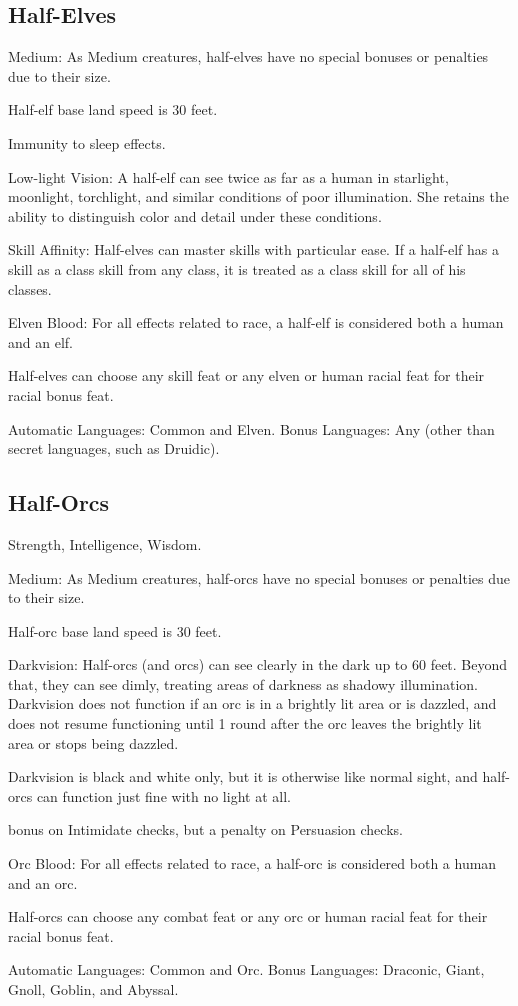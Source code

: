 \subsection{Half-Elves}
\begin{itemize*}
\item Medium: As Medium creatures, half-elves have no special bonuses or penalties due to their size.
\item Half-elf base land speed is 30 feet.
\item Immunity to sleep effects.
\item Low-light Vision: A half-elf can see twice as far as a human in starlight, moonlight, torchlight, and similar conditions of poor illumination. She retains the ability to distinguish color and detail under these conditions.
 \item Skill Affinity: Half-elves can master skills with particular ease. If a half-elf has a skill as a class skill from any class, it is treated as a class skill for all of his classes.
\item Elven Blood: For all effects related to race, a half-elf is considered both a human and an elf.
\item Half-elves can choose any skill feat or any elven or human racial feat for their racial bonus feat.
\item Automatic Languages: Common and Elven. Bonus Languages: Any (other than secret languages, such as Druidic).
\end{itemize*}

\subsection{Half-Orcs}
\begin{itemize*}
\item {} Strength,  Intelligence,  Wisdom.
\item Medium: As Medium creatures, half-orcs have no special bonuses or penalties due to their size.
\item Half-orc base land speed is 30 feet.
\item Darkvision: Half-orcs (and orcs) can see clearly in the dark up to 60 feet.  Beyond that, they can see dimly, treating areas of darkness as shadowy illumination. Darkvision does not function if an orc is in a brightly lit area or is dazzled, and does not resume functioning until 1 round after the orc leaves the brightly lit area or stops being dazzled.
\par Darkvision is black and white only, but it is otherwise like normal
sight, and half-orcs can function just fine with no light at all.
\item {} bonus on Intimidate checks, but a  penalty on Persuasion checks.
\item Orc Blood: For all effects related to race, a half-orc is considered both a human and an orc.
\item Half-orcs can choose any combat feat or any orc or human racial feat for their racial bonus feat.
\item Automatic Languages: Common and Orc. Bonus Languages: Draconic, Giant, Gnoll, Goblin, and Abyssal.
\end{itemize*}

